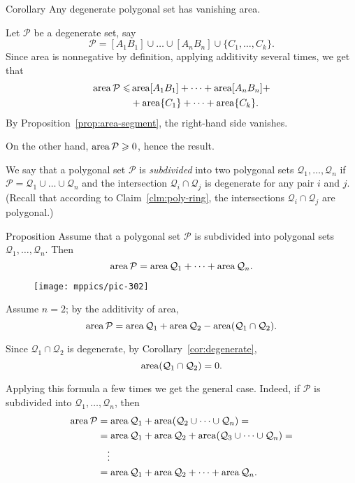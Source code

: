 {\begin{thm}{Corollary}\label{cor:degenerate}
Any degenerate polygonal set has vanishing area.
\end{thm}

Let $\mathcal P$ be a degenerate set,
say
\[\mathcal{P}=[A_1B_1]\cup\dots\cup[A_nB_n]\cup\{C_1,\dots,C_k\}.\]
Since area is nonnegative by definition, applying additivity several times, we get that
\begin{align*}
\mathop{\rm area}\nolimits\mathcal{P}\leqslant
& \mathop{\rm area}\nolimits[A_1B_1]+\dots+\mathop{\rm area}\nolimits[A_nB_n]+
\\
&+\mathop{\rm area}\nolimits\{C_1\}+\dots+\mathop{\rm area}\nolimits\{C_k\}.
\end{align*}
By Proposition~\ref{prop:area-segment}, the right-hand side vanishes.

On the other hand, 
$\mathop{\rm area}\nolimits\mathcal{P}\geqslant 0$,
hence the result.
\qeds

We say that a polygonal set $\mathcal{P}$ is \emph{subdivided} 
into two polygonal sets $\mathcal{Q}_1,\dots,\mathcal{Q}_n$ 
if $\mathcal{P}=\mathcal{Q}_1\cup\dots\cup \mathcal{Q}_n$ 
and the intersection $\mathcal{Q}_i\cap\mathcal{Q}_j$ is degenerate for any pair $i$ and $j$.
(Recall that according to Claim~\ref{clm:poly-ring},
the intersections $\mathcal{Q}_i\cap\mathcal{Q}_j$ are polygonal.)

\begin{thm}{Proposition}\label{prop:subdivision}
Assume that a polygonal set $\mathcal{P}$ is subdivided into polygonal sets $\mathcal{Q}_1,\dots,\mathcal{Q}_n$.
Then 
\[\mathop{\rm area}\nolimits\mathcal{P}=\mathop{\rm area}\nolimits\mathcal{Q}_1+\dots+\mathop{\rm area}\nolimits\mathcal{Q}_n.\]

\end{thm}

\begin{wrapfigure}{r}{26 mm}
\vskip-2mm
\centering
\texttt{[image: mppics/pic-302]}
\end{wrapfigure}

Assume $n=2$; by the additivity of area,
\[\mathop{\rm area}\nolimits\mathcal{P}=\mathop{\rm area}\nolimits\mathcal{Q}_1+\mathop{\rm area}\nolimits\mathcal{Q}_2-\mathop{\rm area}\nolimits(\mathcal{Q}_1\cap\mathcal{Q}_2).\]

Since $\mathcal{Q}_1\cap\mathcal{Q}_2$ is degenerate,
by Corollary~\ref{cor:degenerate},
\[\mathop{\rm area}\nolimits(\mathcal{Q}_1\cap\mathcal{Q}_2)=0.\]

Applying this formula a few times we get the general case.
Indeed, if $\mathcal{P}$ is subdivided into $\mathcal{Q}_1,\dots,\mathcal{Q}_n$, then
\begin{align*}
\mathop{\rm area}\nolimits\mathcal{P}&=\mathop{\rm area}\nolimits\mathcal{Q}_1+\mathop{\rm area}\nolimits(\mathcal{Q}_2\cup\dots\cup\mathcal{Q}_n)=
\\
&=\mathop{\rm area}\nolimits\mathcal{Q}_1+\mathop{\rm area}\nolimits \mathcal{Q}_2+\mathop{\rm area}\nolimits( \mathcal{Q}_3\cup\dots\cup\mathcal{Q}_n)=
\\
&\ \ \ \vdots
\\
&=\mathop{\rm area}\nolimits\mathcal{Q}_1+\mathop{\rm area}\nolimits \mathcal{Q}_2+\dots+\mathop{\rm area}\nolimits\mathcal{Q}_n.
\end{align*}
\qedsf

}
